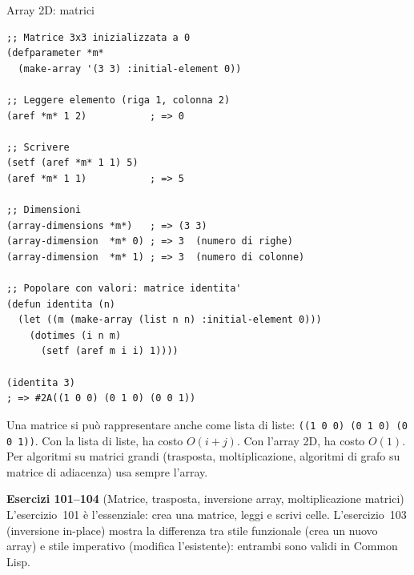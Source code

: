 \begin{concetto}{Array 2D: matrici}
\end{concetto}

\begin{esempio}[Matrice 2D]
\begin{lstlisting}
;; Matrice 3x3 inizializzata a 0
(defparameter *m*
  (make-array '(3 3) :initial-element 0))

;; Leggere elemento (riga 1, colonna 2)
(aref *m* 1 2)           ; => 0

;; Scrivere
(setf (aref *m* 1 1) 5)
(aref *m* 1 1)           ; => 5

;; Dimensioni
(array-dimensions *m*)   ; => (3 3)
(array-dimension  *m* 0) ; => 3  (numero di righe)
(array-dimension  *m* 1) ; => 3  (numero di colonne)

;; Popolare con valori: matrice identita'
(defun identita (n)
  (let ((m (make-array (list n n) :initial-element 0)))
    (dotimes (i n m)
      (setf (aref m i i) 1))))

(identita 3)
; => #2A((1 0 0) (0 1 0) (0 0 1))
\end{lstlisting}
\end{esempio}


\begin{confronto}
Una matrice si può rappresentare anche come lista di liste:
\texttt{((1 0 0) (0 1 0) (0 0 1))}.
Con la lista di liste,  ha costo $O(i+j)$.
Con l'array 2D,  ha costo $O(1)$.
Per algoritmi su matrici grandi (trasposta, moltiplicazione,
algoritmi di grafo su matrice di adiacenza) usa sempre l'array.
\end{confronto}

\begin{workbook}
\textbf{Esercizi 101--104}
(Matrice, trasposta, inversione array, moltiplicazione matrici)\\[4pt]
L'esercizio~101 è l'essenziale: crea una matrice, leggi e scrivi celle.
L'esercizio~103 (inversione in-place) mostra la differenza tra
stile funzionale (crea un nuovo array) e stile imperativo
(modifica l'esistente): entrambi sono validi in Common Lisp.
\end{workbook}

